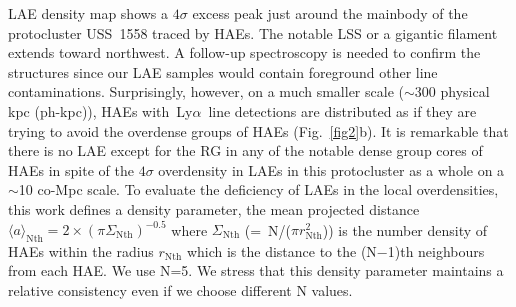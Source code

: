 \documentclass[letters,usenatbib]{mnras}
\def\lya{{\rm\,Ly$\alpha$}}
\begin{document}
LAE density map shows a $4\sigma$ excess peak just around the mainbody of the 
protocluster USS~1558 traced by HAEs. The notable LSS or a gigantic filament 
extends toward northwest. A follow-up spectroscopy is needed to confirm the 
structures since our LAE samples would contain foreground other line 
contaminations. 
Surprisingly, however, on a much smaller scale ($\sim$300 physical kpc (ph-kpc)), 
HAEs with \lya\ line detections are distributed as if they are trying to avoid the 
overdense groups of HAEs (Fig.~\ref{fig2}b). It is remarkable that there is no LAE 
except for the RG in any of the notable dense group cores of HAEs in spite of the 
$4\sigma$ overdensity in LAEs in this protocluster as a whole on a $\sim$10 co-Mpc 
scale. To evaluate the deficiency of LAEs in the local overdensities, this work 
defines a density parameter, the mean projected distance 
$\langle{a}\rangle_\mathrm{Nth} = 2\times({\pi\Sigma_\mathrm{Nth}})^{-0.5}$
where $\Sigma_\mathrm{Nth}$ (=\ N/($\pi r_\mathrm{Nth}^2$)) is the number density 
of HAEs within the radius $r_\mathrm{Nth}$ which is the distance to the (N$-$1)th 
neighbours from each HAE. We use N=5. We stress that this density parameter 
maintains a relative consistency even if we choose different N values. 
\end{document}
